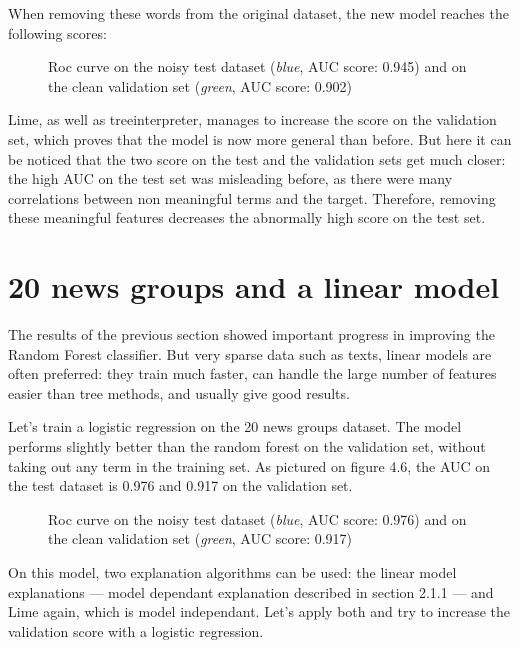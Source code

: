 \documentclass[a4paper,11pt]{kth-mag}
\begin{document}
When removing these words from the original dataset, the new model reaches the following scores:

\begin{figure}[h]
		\centering
    	\def\svgwidth{\columnwidth}
    	\resizebox{0.6\textwidth}{!}{}
    	\caption{Roc curve on the noisy test dataset (\textit{blue}, AUC score: 0.945) and on the clean validation set (\textit{green}, AUC score: 0.902)}
\end{figure}

Lime, as well as treeinterpreter, manages to increase the score on the validation set, which proves that the model is now more general than before. But here it can be noticed that the two score on the test and the validation sets get much closer: the high AUC on the test set was misleading before, as there were many correlations between non meaningful terms and the target. Therefore, removing these meaningful features decreases the abnormally high score on the test set. 

\section{20 news groups and a linear model}

The results of the previous section showed important progress in improving the Random Forest classifier. But very sparse data such as texts, linear models are often preferred: they train much faster, can handle the large number of features easier than tree methods, and usually give good results.

Let's train a logistic regression on the 20 news groups dataset. The model performs slightly better than the random forest on the validation set, without taking out any term in the training set. As pictured on figure 4.6, the AUC on the test dataset is 0.976 and 0.917 on the validation set.

\begin{figure}[h]
		\centering
    	\def\svgwidth{\columnwidth}
    	\resizebox{0.6\textwidth}{!}{}
    	\caption{Roc curve on the noisy test dataset (\textit{blue}, AUC score: 0.976) and on the clean validation set (\textit{green}, AUC score: 0.917)}
\end{figure}

On this model, two explanation algorithms can be used: the linear model explanations --- model dependant explanation described in section 2.1.1 --- and Lime again, which is model independant. Let's apply both and try to increase the validation score with a logistic regression.
\end{document}
